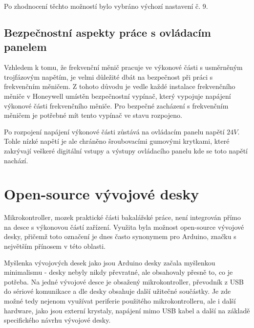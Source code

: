 Po zhodnocení těchto možností bylo vybráno výchozí nastavení č. 9.

\subsection{Bezpečnostní aspekty práce s ovládacím panelem}

Vzhledem k tomu, že frekvenční měnič pracuje ve výkonové části s usměrněným trojfázovým napětím, je velmi důležité dbát na bezpečnost při práci s frekvenčním měničem. Z tohoto důvodu je vedle každé instalace frekvenčního měniče v Honeywell umístěn bezpečnostní vypínač, který vypojuje napájení výkonové části frekvenčního měniče. Pro bezpečné zacházení s frekvenčním měničem je potřebné mít tento vypínač ve stavu rozpojeno.

Po rozpojení napájení výkonové části zůstává na ovládacím panelu napětí $24V$. Tohle nízké napětí je ale chráněno šroubovacími gumovými krytkami, které zakrývají veškeré digitální vstupy a výstupy ovládacího panelu kde se toto napětí nachází.

\section{Open-source vývojové desky}\label{sec:OpenSourceVyvojoveDesky}

Mikrokontroller, mozek praktické části bakalářské práce, není integrován přímo na desce s výkonovou částí zařízení. Využita byla možnost open-source vývojové desky, přičemž toto označení je dnes často synonymem pro Arduino, značku s největším přínosem v této oblasti.

Myšlenka vývojových desek jako jsou Arduino desky začala myšlenkou minimalismu - desky nebyly nikdy převratné, ale obsahovaly přesně to, co je potřeba. Na jedné vývojové desce je obsažený mikrokontroller, převodník z USB do sériové komunikace a dle desky obsahuje další užitečné součástky. Je zde možné tedy nejenom využívat periferie použitého mikrokontrolleru, ale i další hardware, jako jsou externí krystaly, napájení mimo USB kabel a další na základě specifického návrhu vývojové desky.
\cite{KnihaOArduinu}

